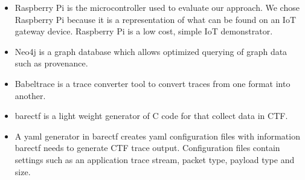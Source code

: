\documentclass[conference]{IEEEtran}
\begin{document}
\begin{itemize}
\item Raspberry Pi is the microcontroller used to evaluate our approach. We chose Raspberry Pi because it is a representation of what can be found on an IoT gateway device. Raspberry Pi is a low cost, simple IoT demonstrator.


\item Neo4j is a graph database which allows optimized querying of graph data such as provenance.


\item Babeltrace is a trace converter tool to convert traces from one format into another. 

\item barectf is a light weight generator of C code for  that collect data in CTF. 

\item  A yaml generator in barectf creates yaml  configuration files with information barectf needs to generate CTF trace output. Configuration  files contain settings such as an application trace stream, packet type, payload type and size. 


\end{itemize}

%
%
%

%
\end{document}
